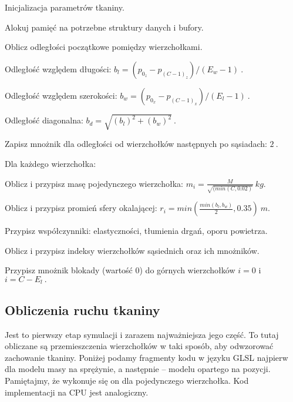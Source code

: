 		\begin{algorithm}
			\label{alg_5_4}
			\caption{Inicjalizacja parametrów tkaniny.}	
			
			Alokuj pamięć na potrzebne struktury danych i bufory.
			
			Oblicz odległości początkowe pomiędzy wierzchołkami.
			
			\Indp
			
				Odległość względem długości: \( b_{l} = (p_{0_{z}} - p_{(C-1)_{z}}) / (E_{w} - 1) \ . \)
				
				Odległość względem szerokości: \( b_{w} = (p_{0_{x}} - p_{(C-1)_{x}}) / (E_{l} - 1) \ . \)
				
				Odległość diagonalna: \( b_{d} = \sqrt{ (b_{l})^{2} + (b_{w})^2 } \ . \)
				
				Zapisz mnożnik dla odległości od wierzchołków następnych po sąsiadach: \(2 \ .\)
			
			\Indm
			
			Dla każdego wierzchołka:
			
			\Indp
			
				Oblicz i przypisz masę pojedynczego wierzchołka: \( m_{i} = \frac{M}{\sqrt{(min(C, 0.02)}} \  kg. \)
				
				Oblicz i przypisz promień sfery okalającej: \( r_{i} = min( \frac{min(b_{l}, b_{w})}{2}, 0.35 ) \ m. \)
				
				Przypisz współczynniki: elastyczności, tłumienia drgań, oporu powietrza.
				
				Oblicz i przypisz indeksy wierzchołków sąsiednich oraz ich mnożników.
			
			\Indm
			
			Przypisz mnożnik blokady (wartość \(0\)) do górnych wierzchołków \(i = 0\) i \(i = C - E_{l} \ .\)
			
		\end{algorithm}
			
		\subsection{Obliczenia ruchu tkaniny}
		\label{t:symulacja:dzialanie:ruch}
			
		
		Jest to pierwszy etap symulacji i zarazem najważniejsza jego część. To tutaj obliczane są przemieszczenia wierzchołków w taki sposób, aby odwzorować zachowanie tkaniny. Poniżej podamy fragmenty kodu w języku GLSL najpierw dla modelu masy na sprężynie, a następnie -- modelu opartego na pozycji. Pamiętajmy, że wykonuje się on dla pojedynczego wierzchołka. Kod implementacji na CPU jest analogiczny.
		\newpage	
		

